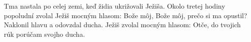 Tma nastala po celej zemi, keď židia ukrižovali Ježiša. Okolo tretej hodiny popoludní zvolal Ježiš mocným hlasom: Bože môj, Bože môj, prečo si ma opustil?
\versseparator
Naklonil hlavu a odovzdal ducha.
\versseparator
Ježiš zvolal mocným hlasom: Otče, do tvojich rúk porúčam svojho ducha.